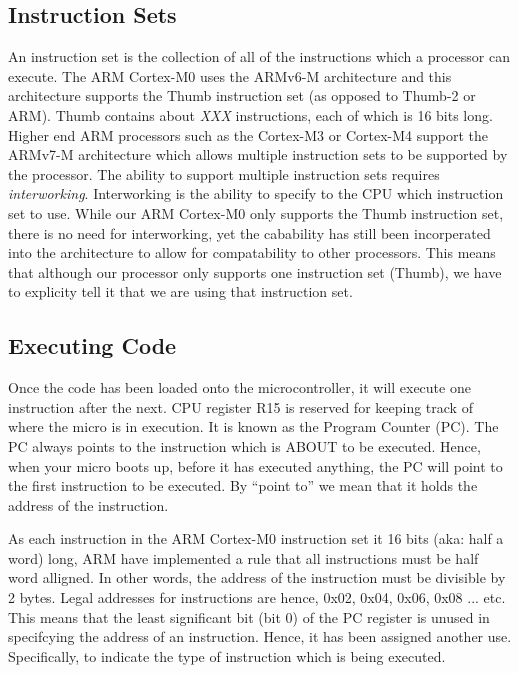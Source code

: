 \subsection{Instruction Sets}
An instruction set is the collection of all of the instructions which a processor can execute. 
The ARM Cortex-M0 uses the ARMv6-M architecture and this architecture supports the Thumb instruction set (as opposed to Thumb-2 or ARM). 
Thumb contains about \emph{XXX} instructions, each of which is 16 bits long. \\

Higher end ARM processors such as the Cortex-M3 or Cortex-M4 support the ARMv7-M architecture which allows multiple instruction sets to be supported by the processor. 
The ability to support multiple instruction sets requires \emph{interworking}. Interworking is the ability to specify to the CPU which instruction set to use. 
While our ARM Cortex-M0 only supports the Thumb instruction set, there is no need for interworking, yet the cabability has still been incorperated into the architecture to allow for compatability to other processors. 
This means that although our processor only supports one instruction set (Thumb), we have to explicity tell it that we are using that instruction set. 


\subsection{Executing Code}
Once the code has been loaded onto the microcontroller, it will execute one instruction after the next. 
CPU register R15 is reserved for keeping track of where the micro is in execution. It is known as the Program Counter (PC).
The PC always points to the instruction which is ABOUT to be executed. Hence, when your micro boots up, before it has executed anything, the PC will point to the first instruction to be executed.
By ``point to'' we mean that it holds the address of the instruction. 

As each instruction in the ARM Cortex-M0 instruction set it 16 bits (aka: half a word) long, ARM have implemented a rule that all instructions must be half word alligned. In other words, the address of the instruction must be divisible by 2 bytes. Legal addresses for instructions are hence, 0x02, 0x04, 0x06, 0x08 ... etc. 
This means that the least significant bit (bit 0) of the PC register is unused in specifcying the address of an instruction. 
Hence, it has been assigned another use. Specifically, to indicate the type of instruction which is being executed. 



